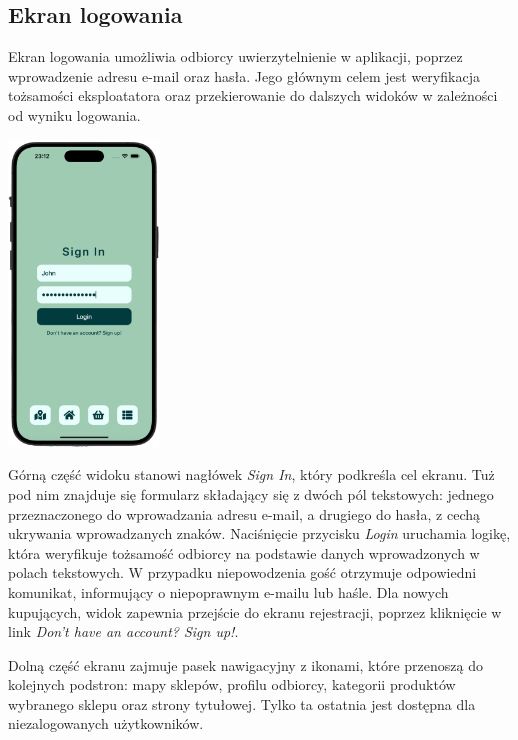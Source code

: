 \subsection{Ekran logowania}

Ekran logowania umożliwia odbiorcy uwierzytelnienie w aplikacji, poprzez wprowadzenie adresu e-mail oraz hasła. Jego głównym celem jest weryfikacja tożsamości eksploatatora oraz przekierowanie do dalszych widoków w zależności od wyniku logowania. 

\begin{center} 
    \includegraphics[width=0.3\textwidth]{images/front/login_page.png} 
\end{center}

Górną część widoku stanowi nagłówek \textit{Sign In}, który podkreśla cel ekranu. Tuż pod nim znajduje się formularz składający się z dwóch pól tekstowych: jednego przeznaczonego do wprowadzania adresu e-mail, a drugiego do hasła, z cechą ukrywania wprowadzanych znaków. Naciśnięcie przycisku \textit{Login} uruchamia logikę, która weryfikuje tożsamość odbiorcy na podstawie danych wprowadzonych w polach tekstowych. W przypadku niepowodzenia gość otrzymuje odpowiedni komunikat, informujący o niepoprawnym e-mailu lub haśle. Dla nowych kupujących, widok zapewnia przejście do ekranu rejestracji, poprzez kliknięcie w link \textit{Don't have an account? Sign up!}. 

Dolną część ekranu zajmuje pasek nawigacyjny z ikonami, które przenoszą do kolejnych podstron: mapy sklepów, profilu odbiorcy, kategorii produktów wybranego sklepu oraz strony tytułowej. Tylko ta ostatnia jest dostępna dla niezalogowanych użytkowników.

